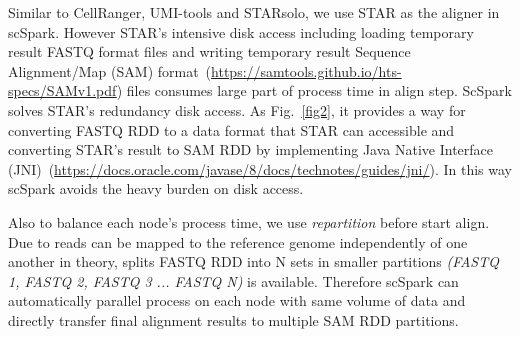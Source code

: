 \documentclass[conference]{IEEEtran}
\begin{document}

Similar to CellRanger, UMI-tools and STARsolo, we use STAR as the aligner in scSpark.
However STAR's intensive disk access including loading temporary result FASTQ format files and writing temporary result Sequence Alignment/Map (SAM) format~(\url{https://samtools.github.io/hts-specs/SAMv1.pdf}) files consumes large part of process time in align step.
ScSpark solves STAR's redundancy disk access.
As Fig.~\ref{fig2}, it provides a way for converting FASTQ RDD to a data format that STAR can accessible and converting STAR's result to SAM RDD by implementing Java Native Interface (JNI)~(\url{https://docs.oracle.com/javase/8/docs/technotes/guides/jni/}).
In this way scSpark avoids the heavy burden on disk access. %

Also to balance each node's process time, we use \textit{repartition} before start align.
Due to reads can be mapped to the reference genome independently of one another in theory, splits FASTQ RDD into N sets in smaller partitions \textit{(FASTQ 1, FASTQ 2, FASTQ 3 ... FASTQ N)} is available.
Therefore scSpark can automatically parallel process on each node with same volume of data and directly transfer final alignment results to multiple SAM RDD partitions.

\end{document}
